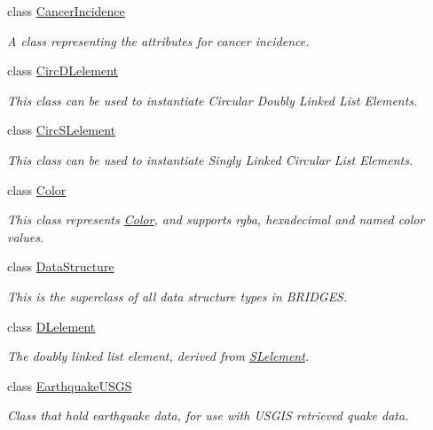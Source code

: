 \begin{DoxyCompactItemize}
class \hyperlink{classbridges_1_1_cancer_incidence}{Cancer\+Incidence}
\begin{DoxyCompactList}\small\item\em A class representing the attributes for cancer incidence. \end{DoxyCompactList}\item 
class \hyperlink{classbridges_1_1_circ_d_lelement}{Circ\+D\+Lelement}
\begin{DoxyCompactList}\small\item\em This class can be used to instantiate Circular Doubly Linked List Elements. \end{DoxyCompactList}\item 
class \hyperlink{classbridges_1_1_circ_s_lelement}{Circ\+S\+Lelement}
\begin{DoxyCompactList}\small\item\em This class can be used to instantiate Singly Linked Circular List Elements. \end{DoxyCompactList}\item 
class \hyperlink{classbridges_1_1_color}{Color}
\begin{DoxyCompactList}\small\item\em This class represents \hyperlink{classbridges_1_1_color}{Color}, and supports rgba, hexadecimal and named color values. \end{DoxyCompactList}\item 
class \hyperlink{classbridges_1_1_data_structure}{Data\+Structure}
\begin{DoxyCompactList}\small\item\em This is the superclass of all data structure types in B\+R\+I\+D\+G\+E\+S. \end{DoxyCompactList}\item 
class \hyperlink{classbridges_1_1_d_lelement}{D\+Lelement}
\begin{DoxyCompactList}\small\item\em The doubly linked list element, derived from \hyperlink{classbridges_1_1_s_lelement}{S\+Lelement}. \end{DoxyCompactList}\item 
class \hyperlink{classbridges_1_1_earthquake_u_s_g_s}{Earthquake\+U\+S\+G\+S}
\begin{DoxyCompactList}\small\item\em Class that hold earthquake data, for use with U\+S\+G\+I\+S retrieved quake data. \end{DoxyCompactList}\item 

\end{DoxyCompactItemize}
